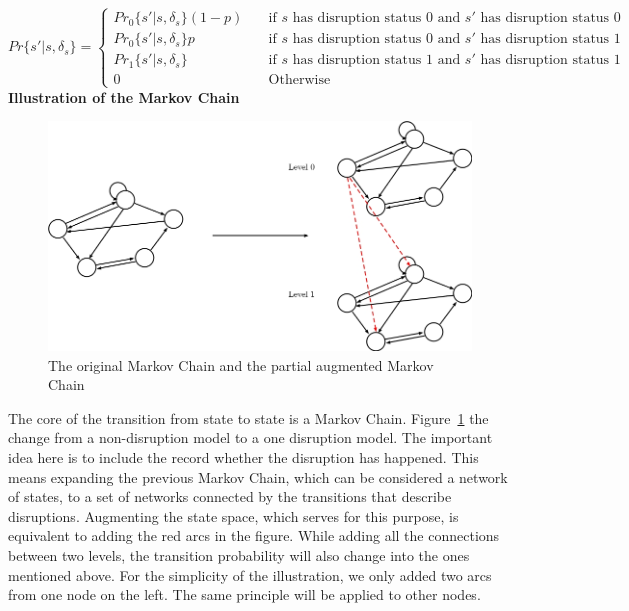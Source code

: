 \documentclass[11pt]{article}
\begin{document}
		\[ Pr\{s'|s,\delta_s\} = \begin{cases} 
					Pr_0\{s'|s,\delta_s\}(1-p) & \quad \text{if } s \text{ has disruption status 0 and } s' \text{ has disruption status 0}\\ 
					Pr_0\{s'|s,\delta_s\}p & \quad \text{if } s \text{ has disruption status 0 and } s' \text{ has disruption status 1}\\ 
					Pr_1\{s'|s,\delta_s\} & \quad \text{if } s \text{ has disruption status 1 and } s' \text{ has disruption status 1}\\ 
					0 & \quad \text{Otherwise}
					\end{cases} \]
		\newline \textbf{Illustration of the Markov Chain}\\
		\begin{figure}[H]
			\centering
			\includegraphics[width=\textwidth]{Augmented_Network}
			\caption{The original Markov Chain and the partial augmented Markov Chain}
			\label{AugNet}
		\end{figure}
		The core of the transition from state to state is a Markov Chain. Figure~\ref{AugNet} the change from a non-disruption model to a one disruption model. The important idea here is to include the record whether the disruption has happened. This means expanding the previous Markov Chain, which can be considered a network of states, to a set of networks connected by the transitions that describe disruptions. Augmenting the state space, which serves for this purpose, is equivalent to adding the red arcs in the figure. While adding all the connections between two levels, the transition probability will also change into the ones mentioned above. For the simplicity of the illustration, we only added two arcs from one node on the left. The same principle will be applied to other nodes. 
	
\end{document}
